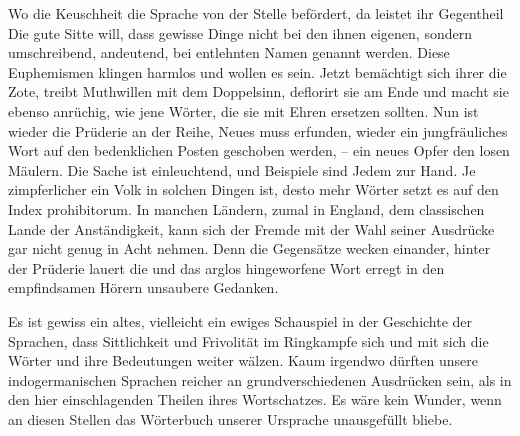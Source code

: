{

Wo die Keuschheit die Sprache von der Stelle befördert, da leistet ihr Gegentheil  Die gute Sitte will, dass gewisse Dinge nicht bei den ihnen eigenen, sondern umschreibend, andeutend, bei entlehnten Namen genannt werden. Diese Euphemismen klingen harmlos und wollen es sein. Jetzt bemächtigt sich ihrer die Zote, treibt Muthwillen mit dem Doppelsinn, deflorirt sie am Ende und macht sie ebenso anrüchig, wie jene Wörter, die sie mit Ehren ersetzen sollten. Nun ist wieder die Prüderie an der Reihe, Neues muss erfunden, wieder ein jungfräuliches Wort auf den bedenklichen Posten geschoben werden, – ein neues Opfer den losen Mäulern. Die Sache ist einleuchtend, und Beispiele sind Jedem zur Hand. Je zimpferlicher ein Volk in solchen Dingen ist, desto mehr Wörter setzt es auf den Index prohibitorum. In manchen \label{sp.249} Ländern, zumal in England, dem classischen Lande der Anständigkeit, kann sich der Fremde mit der Wahl seiner Ausdrücke gar nicht genug in Acht nehmen. Denn die Gegensätze wecken einander, hinter der Prüderie lauert die  und das arglos hingeworfene Wort erregt in den empfindsamen Hörern unsaubere Gedanken.

Es ist gewiss ein altes, vielleicht ein ewiges Schauspiel in der Geschichte der Sprachen, dass Sittlichkeit und Frivolität im Ringkampfe sich und mit sich die Wörter und ihre Bedeutungen weiter wälzen. Kaum irgendwo dürften unsere indogermanischen Sprachen reicher an grundverschiedenen Ausdrücken sein, als in den hier einschlagenden Theilen ihres Wortschatzes. Es wäre kein Wunder, wenn an diesen Stellen das Wörterbuch unserer Ursprache  unausgefüllt bliebe.

}
